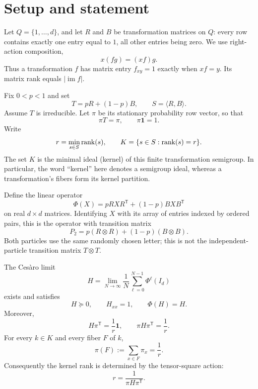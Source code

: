 




\section{Setup and statement}
Let $Q=\{1,\ldots,d\}$, and let $R$ and $B$ be transformation matrices
on $Q$: every row contains exactly one entry equal to $1$, all other
entries being zero. We use right-action composition,
\[
 x(fg)=(xf)g.
\]
Thus a transformation $f$ has matrix entry $f_{xy}=1$ exactly when
$xf=y$. Its matrix rank equals $|\operatorname{im} f|$.

Fix $0<p<1$ and set
\[
 T=pR+(1-p)B,\qquad S=\langle R,B\rangle.
\]
Assume $T$ is irreducible. Let $\pi$ be its stationary probability row
vector, so that
\[
 \pi T=\pi,\qquad \pi\mathbf{1}=1.
\]
Write
\[
 r=\min_{s\in S}\operatorname{rank}(s),\qquad K=\{s\in S:\operatorname{rank}(s)=r\}.
\]
The set $K$ is the minimal ideal (kernel) of this finite transformation
semigroup. In particular, the word ``kernel'' here denotes a semigroup
ideal, whereas a transformation's fibers form its kernel partition.

Define the linear operator
\[
 \Phi(X)=pRXR^{\mathsf{T}}+(1-p)BXB^{\mathsf{T}}
\]
on real $d\times d$ matrices. Identifying $X$ with its array of entries
indexed by ordered pairs, this is the operator with transition matrix
\[
 P_2=p(R\otimes R)+(1-p)(B\otimes B).
\]
Both particles use the same randomly chosen letter; this is not the
independent-particle transition matrix $T\otimes T$.

\begin{theorem}\label{tensor-book:thm:main}

The Ces\`aro limit
\[
 H=\lim_{N\to\infty}\frac1N\sum_{\ell=0}^{N-1}\Phi^\ell(I_d)
\]
exists and satisfies
\[
 H\succeq0,\qquad H_{xx}=1,\qquad \Phi(H)=H.
\]
Moreover,
\begin{equation}\label{tensor-book:eq:stationary}
 H\pi^{\mathsf{T}}=\frac1r\mathbf{1},
 \qquad
 \pi H\pi^{\mathsf{T}}=\frac1r.
\end{equation}
For every $k\in K$ and every fiber $F$ of $k$,
\begin{equation}\label{tensor-book:eq:friedman}
 \pi(F):=\sum_{x\in F}\pi_x=\frac1r.
\end{equation}
Consequently the kernel rank is determined by the tensor-square action:
\[
 \boxed{\displaystyle r=\frac{1}{\pi H\pi^{\mathsf{T}}}.}
\]
\end{theorem}

